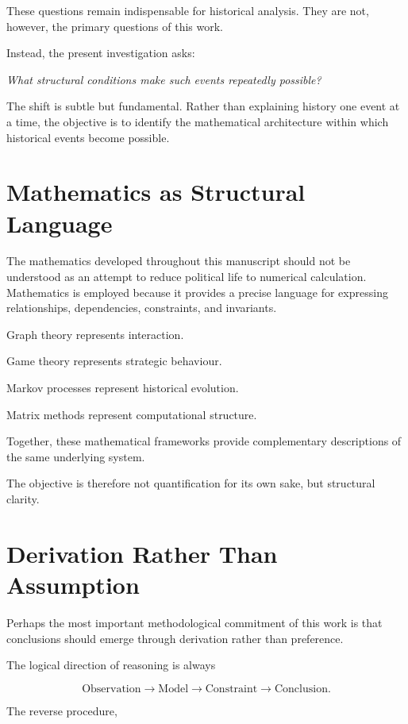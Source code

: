 \documentclass[11pt,openany]{book}
\theoremstyle{plain}
\theoremstyle{definition}
\begin{document}
These questions remain indispensable for historical analysis. They are not, however, the primary questions of this work.

Instead, the present investigation asks:

\begin{center}
\emph{
What structural conditions make such events repeatedly possible?
}
\end{center}

The shift is subtle but fundamental. Rather than explaining history one event at a time, the objective is to identify the mathematical architecture within which historical events become possible.

\section*{Mathematics as Structural Language}

The mathematics developed throughout this manuscript should not be understood as an attempt to reduce political life to numerical calculation. Mathematics is employed because it provides a precise language for expressing relationships, dependencies, constraints, and invariants.

Graph theory represents interaction.

Game theory represents strategic behaviour.

Markov processes represent historical evolution.

Matrix methods represent computational structure.

Together, these mathematical frameworks provide complementary descriptions of the same underlying system.

The objective is therefore not quantification for its own sake, but structural clarity.

\section*{Derivation Rather Than Assumption}

Perhaps the most important methodological commitment of this work is that conclusions should emerge through derivation rather than preference.

The logical direction of reasoning is always

\[
\boxed{
\text{Observation}
\longrightarrow
\text{Model}
\longrightarrow
\text{Constraint}
\longrightarrow
\text{Conclusion}.
}
\]

The reverse procedure,
\end{document}
